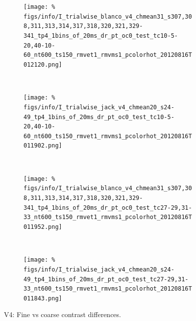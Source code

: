 
\begin{figure}[htbp]
    \begin{subfigure}[b]{0.5\linewidth}
        \centering
        \caption{}
        \label{fig:b4-1x20cc}
        \texttt{[image: \%
figs/info/I\_trialwise\_blanco\_v4\_chmean31\_s307,308,311,313,314,317,318,320,321,329-341\_tp4\_1bins\_of\_20ms\_dr\_pt\_oc0\_test\_tc10-5-20,40-10-60\_nt600\_ts150\_rmvet1\_rmvms1\_pcolorhot\_20120816T012120.png]}
    \end{subfigure}
    ~~
    \begin{subfigure}[b]{0.5\linewidth}
        \centering
        \caption{}
        \label{fig:j4-1x20cc}
        \texttt{[image: \%
figs/info/I\_trialwise\_jack\_v4\_chmean20\_s24-49\_tp4\_1bins\_of\_20ms\_dr\_pt\_oc0\_test\_tc10-5-20,40-10-60\_nt600\_ts150\_rmvet1\_rmvms1\_pcolorhot\_20120816T011902.png]}
    \end{subfigure}
    \\
    \begin{subfigure}[b]{0.5\linewidth}
        \centering
        \caption{}
        \label{fig:b4-1x20fc}
        \texttt{[image: \%
figs/info/I\_trialwise\_blanco\_v4\_chmean31\_s307,308,311,313,314,317,318,320,321,329-341\_tp4\_1bins\_of\_20ms\_dr\_pt\_oc0\_test\_tc27-29,31-33\_nt600\_ts150\_rmvet1\_rmvms1\_pcolorhot\_20120816T011952.png]}
    \end{subfigure}
    ~~
    \begin{subfigure}[b]{0.5\linewidth}
        \centering
        \caption{}
        \label{fig:j4-1x20fc}
        \texttt{[image: \%
figs/info/I\_trialwise\_jack\_v4\_chmean20\_s24-49\_tp4\_1bins\_of\_20ms\_dr\_pt\_oc0\_test\_tc27-29,31-33\_nt600\_ts150\_rmvet1\_rmvms1\_pcolorhot\_20120816T011843.png]}
    \end{subfigure}
    \caption{\ac{V4}: Fine vs coarse contrast differences.
}
\end{figure}
